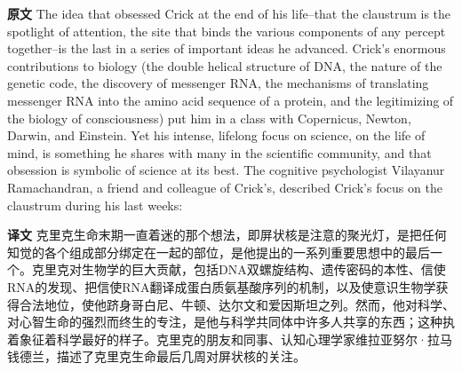 \documentclass[UTF8]{ctexart}
\newenvironment{english}{\par\small\noindent\textbf{原文}\quad\ignorespaces}{\par}
\newenvironment{zhtranslation}{\par\noindent\textbf{译文}\quad\ignorespaces}{\par\vspace{0.35em}}
\begin{document}
\begin{english}
The idea that obsessed Crick at the end of his life--that the claustrum is the spotlight of attention, the site that binds the various components of any percept together--is the last in a series of important ideas he advanced. Crick's enormous contributions to biology (the double helical structure of DNA, the nature of the genetic code, the discovery of messenger RNA, the mechanisms of translating messenger RNA into the amino acid sequence of a protein, and the legitimizing of the biology of consciousness) put him in a class with Copernicus, Newton, Darwin, and Einstein. Yet his intense, lifelong focus on science, on the life of mind, is something he shares with many in the scientific community, and that obsession is symbolic of science at its best. The cognitive psychologist Vilayanur Ramachandran, a friend and colleague of Crick's, described Crick's focus on the claustrum during his last weeks:
\end{english}
\begin{zhtranslation}
克里克生命末期一直着迷的那个想法，即屏状核是注意的聚光灯，是把任何知觉的各个组成部分绑定在一起的部位，是他提出的一系列重要思想中的最后一个。克里克对生物学的巨大贡献，包括DNA双螺旋结构、遗传密码的本性、信使RNA的发现、把信使RNA翻译成蛋白质氨基酸序列的机制，以及使意识生物学获得合法地位，使他跻身哥白尼、牛顿、达尔文和爱因斯坦之列。然而，他对科学、对心智生命的强烈而终生的专注，是他与科学共同体中许多人共享的东西；这种执着象征着科学最好的样子。克里克的朋友和同事、认知心理学家维拉亚努尔·拉马钱德兰，描述了克里克生命最后几周对屏状核的关注。\end{zhtranslation}
\end{document}
